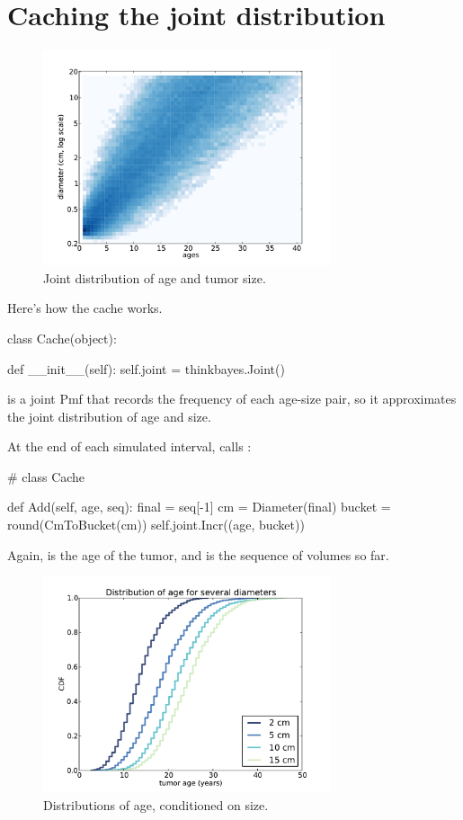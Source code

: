 \documentclass[12pt]{book}
\theoremstyle{exercise}
\begin{document}
\section{Caching the joint distribution}

\begin{figure}
\centerline{\includegraphics[height=2.5in]{figs/kidney8.pdf}}
\caption{Joint distribution of age and tumor size.}
\label{fig.kidney8}
\end{figure}

Here's how the cache works.  

\begin{code}
class Cache(object):

    def __init__(self):
        self.joint = thinkbayes.Joint()
\end{code}

 is a joint Pmf that records the
frequency of each age-size pair, so it approximates the
joint distribution of age and size.

At the end of each simulated interval,  calls
:

\begin{code}
# class Cache

    def Add(self, age, seq):
        final = seq[-1]
        cm = Diameter(final)
        bucket = round(CmToBucket(cm))
        self.joint.Incr((age, bucket))
\end{code}

Again,  is the age of the tumor, and  is the
sequence of volumes so far.

\begin{figure}
\centerline{\includegraphics[height=2.5in]{figs/kidney6.pdf}}
\caption{Distributions of age, conditioned on size.}
\label{fig.kidney6}
\end{figure}
\end{document}

